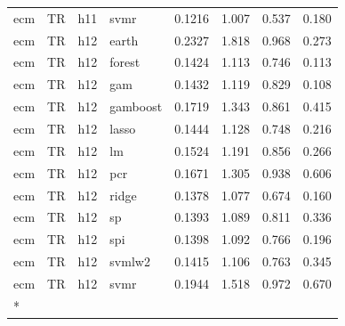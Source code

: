 \begin{ThreePartTable}
\begin{longtable}[t]{llclcccc}
ecm & TR & h11 & svmr & 0.1216 & 1.007 & 0.537 & 0.180\\
\addlinespace
ecm & TR & h12 & earth & 0.2327 & 1.818 & 0.968 & 0.273\\
ecm & TR & h12 & forest & 0.1424 & 1.113 & 0.746 & 0.113\\
ecm & TR & h12 & gam & 0.1432 & 1.119 & 0.829 & 0.108\\
ecm & TR & h12 & gamboost & 0.1719 & 1.343 & 0.861 & 0.415\\
ecm & TR & h12 & lasso & 0.1444 & 1.128 & 0.748 & 0.216\\
ecm & TR & h12 & lm & 0.1524 & 1.191 & 0.856 & 0.266\\
ecm & TR & h12 & pcr & 0.1671 & 1.305 & 0.938 & 0.606\\
ecm & TR & h12 & ridge & 0.1378 & 1.077 & 0.674 & 0.160\\
ecm & TR & h12 & sp & 0.1393 & 1.089 & 0.811 & 0.336\\
ecm & TR & h12 & spi & 0.1398 & 1.092 & 0.766 & 0.196\\
ecm & TR & h12 & svmlw2 & 0.1415 & 1.106 & 0.763 & 0.345\\
ecm & TR & h12 & svmr & 0.1944 & 1.518 & 0.972 & 0.670\\*
\end{longtable}
\end{ThreePartTable}
\endgroup{}
